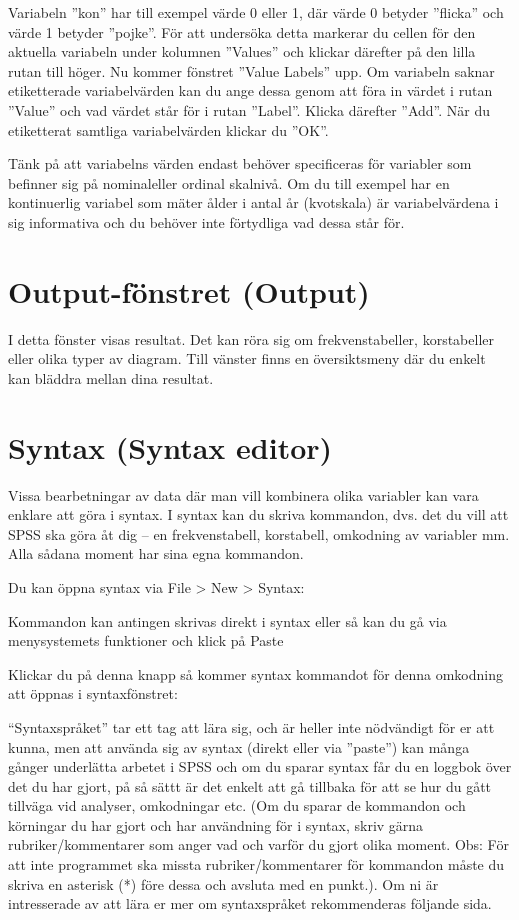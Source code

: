 \documentclass[
]{book}
\begin{document}
Variabeln ''kon'' har till exempel värde 0 eller 1, där värde 0 betyder ''flicka'' och värde 1 betyder
''pojke''. För att undersöka detta markerar du cellen för den aktuella variabeln under kolumnen
''Values'' och klickar därefter på den lilla rutan till höger. Nu kommer fönstret ''Value Labels'' upp.
Om variabeln saknar etiketterade variabelvärden kan du ange dessa genom att föra in värdet i rutan
''Value'' och vad värdet står för i rutan ''Label''. Klicka därefter ''Add''. När du etiketterat samtliga
variabelvärden klickar du ''OK''.

Tänk på att variabelns värden endast behöver specificeras för variabler som befinner sig på nominaleller
ordinal skalnivå. Om du till exempel har en kontinuerlig variabel som mäter ålder i antal år
(kvotskala) är variabelvärdena i sig informativa och du behöver inte förtydliga vad dessa står för.

\hypertarget{output-fuxf6nstret-output}{%
\section{Output-fönstret (Output)}\label{output-fuxf6nstret-output}}

I detta fönster visas resultat. Det kan röra sig
om frekvenstabeller, korstabeller eller olika
typer av diagram. Till vänster finns en
översiktsmeny där du enkelt kan bläddra
mellan dina resultat.

\hypertarget{syntax-syntax-editor}{%
\section{Syntax (Syntax editor)}\label{syntax-syntax-editor}}

Vissa bearbetningar av data där man vill kombinera olika variabler kan vara enklare att göra i syntax. I syntax kan du skriva kommandon, dvs. det du vill att SPSS ska göra åt dig -- en frekvenstabell,
korstabell, omkodning av variabler mm. Alla sådana moment har sina egna kommandon.

Du kan öppna syntax via File \textgreater{} New \textgreater{} Syntax:

Kommandon kan antingen skrivas direkt i syntax eller så kan du gå via menysystemets funktioner och
klick på Paste

Klickar du på denna knapp så kommer syntax kommandot för denna omkodning att öppnas i
syntaxfönstret:

``Syntaxspråket'' tar ett tag att lära sig, och är heller inte nödvändigt för er att kunna, men att använda
sig av syntax (direkt eller via ''paste'') kan många gånger underlätta arbetet i SPSS och om du sparar
syntax får du en loggbok över det du har gjort, på så sättt är det enkelt att gå tillbaka för att se hur du
gått tillväga vid analyser, omkodningar etc. (Om du sparar de kommandon och körningar du har gjort
och har användning för i syntax, skriv gärna rubriker/kommentarer som anger vad och varför du gjort
olika moment. Obs: För att inte programmet ska missta rubriker/kommentarer för kommandon måste
du skriva en asterisk (*) före dessa och avsluta med en punkt.). Om ni är intresserade av att lära er mer om syntaxspråket rekommenderas följande sida.
\end{document}
